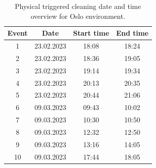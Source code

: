 \begin{table}[H]
\centering
\caption{Physical triggered cleaning date and time overview for Oslo environment.}
\label{tab:PTC_dateandtimeOslo}
\begin{tabular}{|c|c|c|c|}
\hline
\textbf{Event} & \textbf{Date} & \textbf{Start time} & \textbf{End time} \\ \hline
1              & 23.02.2023         & 18:08               & 18:24             \\ \hline
2              & 23.02.2023         & 18:36               & 19:05             \\ \hline
3              & 23.02.2023         & 19:14               & 19:34             \\ \hline
4              & 23.02.2023         & 20:13               & 20:35             \\ \hline
5              & 23.02.2023         & 20:44               & 21:06             \\ \hline
6              & 09.03.2023         & 09:43               & 10:02             \\ \hline
7              & 09.03.2023         & 10:30               & 10:50             \\ \hline
8              & 09.03.2023         & 12:32               & 12:50             \\ \hline
9              & 09.03.2023         & 13:16               & 14:05             \\ \hline
10             & 09.03.2023         & 17:44               & 18:05             \\ \hline
\end{tabular}
\end{table}

